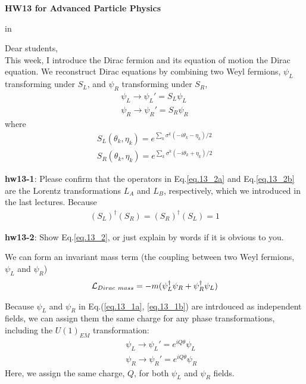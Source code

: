 \documentclass[12pt]{article}
\begin{document}
\begin{center}
{\large\bf HW13 for Advanced Particle Physics} \\

\end{center}

 in

Dear students, \\

  This week, I introduce the Dirac fermion and its equation of motion
  the Dirac equation.  We reconstruct Dirac equations by combining two
  Weyl fermions, $\psi_L$ transforming under $S_L$, and $\psi_R$ transforming
  under $S_R$,
\begin{eqnarray} 
    \psi_L \to \psi_L' = S_L \psi_L \label{eq.13_1a}  \\
    \psi_R \to  \psi_R' = S_R \psi_R \label{eq.13_1b}
\end{eqnarray}
  where
\begin{eqnarray}
    S_L(\theta_k,\eta_k)
  = e^{\sum_k \sigma^k (-i\theta_k -\eta_k)/2}\label{eq.13_2a} \\ 
  S_R(\theta_k,\eta_k)
  = e^{\sum_k \sigma^k (-i\theta_k +\eta_k)/2} \label{eq.13_2b}
\end{eqnarray}

{\bf hw13-1}: Please confirm that the operators in Eq.\ref{eq.13_2a} and Eq.\ref{eq.13_2b} are the
  Lorentz transformations $L_A$ and $L_B$, respectively, which we
  introduced in the last lectures. Because
\begin{eqnarray}
  (S_L)^\dagger (S_R) = (S_R)^\dagger (S_L) = 1 \label{eq.13_2}
\end{eqnarray}

{\bf hw13-2}: Show Eq.\ref{eq.13_2}, or just explain by words if it is obvious to you.

  We can form an invariant mass term (the coupling between two Weyl
  fermions, $\psi_L$ and $\psi_R$)
\begin{eqnarray}
  {\cal L}_{Dirac~mass}
  = -m (\psi_L^\dagger \psi_R + \psi_R^\dagger \psi_L) \label{eq.13_3}
\end{eqnarray}

  Because $\psi_L$ and $\psi_R$ in Eq.(\ref{eq.13_1a}, \ref{eq.13_1b}) are intrdouced as independent fields,
  we can assign them the same charge for any phase transformations,
  including the $U(1)_{EM}$ transformation:
\begin{eqnarray}
  &&\psi_L \to \psi_L' = e^{iQ\theta} \psi_L  \label{eq.13_4a} \\
  &&\psi_R \to  \psi_R' = e^{iQ\theta} \psi_R \label{eq.13_4b}
\end{eqnarray}
  Here, we assign the same charge, $Q$, for both $\psi_L$ and $\psi_R$ fields.
\end{document}
